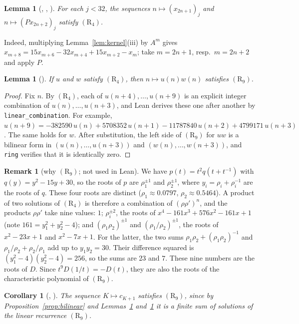 \documentclass[11pt]{amsart}
\theoremstyle{plain}
\newtheorem{lemma}[theorem]{Lemma}
\newtheorem{corollary}[theorem]{Corollary}
\theoremstyle{definition}
\newtheorem{remark}[theorem]{Remark}
\begin{document}
\begin{lemma}[, , ]\label{lem:rec4}
For each $j<32$, the sequences $n\mapsto(x_{2n+1})_j$ and $n\mapsto(Px_{2n+2})_j$ satisfy $(\mathrm{R}_4)$.
\end{lemma}

\noindent Indeed, multiplying Lemma~\ref{lem:kernel}(iii) by $A^m$ gives $x_{m+8}=15x_{m+6}-32x_{m+4}+15x_{m+2}-x_m$; take $m=2n+1$, resp.\ $m=2n+2$ and apply $P$.

\begin{lemma}[]\label{lem:prod}
If $u$ and $w$ satisfy $(\mathrm{R}_4)$, then $n\mapsto u(n)w(n)$ satisfies $(\mathrm{R}_9)$.
\end{lemma}

\begin{proof}
Fix $n$. By $(\mathrm{R}_4)$, each of $u(n+4),\dots,u(n+9)$ is an explicit integer combination of $u(n),\dots,u(n+3)$, and Lean derives these one after another by \texttt{linear\_combination}. For example,
$u(n+9)=-382590\,u(n)+5708352\,u(n+1)-11787840\,u(n+2)+4799171\,u(n+3)$.
The same holds for $w$. After substitution, the left side of $(\mathrm{R}_9)$ for $uw$ is a bilinear form in $(u(n),\dots,u(n+3))$ and $(w(n),\dots,w(n+3))$, and \texttt{ring} verifies that it is identically zero.
\end{proof}

\begin{remark}[why $(\mathrm{R}_9)$; not used in Lean]\label{rem:roots}
We have $p(t)=t^2q(t+t^{-1})$ with $q(y)=y^2-15y+30$, so the roots of $p$ are $\rho_1^{\pm1}$ and $\rho_2^{\pm1}$, where $y_i=\rho_i+\rho_i^{-1}$ are the roots of $q$. These four roots are distinct ($\rho_1\approx0.0797$, $\rho_2\approx0.5464$). A product of two solutions of $(\mathrm{R}_4)$ is therefore a combination of $(\rho\rho')^n$, and the products $\rho\rho'$ take nine values: $1$; $\rho_i^{\pm2}$, the roots of $x^4-161x^3+576x^2-161x+1$ (note $161=y_1^2+y_2^2-4$); and $(\rho_1\rho_2)^{\pm1}$ and $(\rho_1/\rho_2)^{\pm1}$, the roots of $x^2-23x+1$ and $x^2-7x+1$. For the latter, the two sums $\rho_1\rho_2+(\rho_1\rho_2)^{-1}$ and $\rho_1/\rho_2+\rho_2/\rho_1$ add up to $y_1y_2=30$. Their difference squared is $(y_1^2-4)(y_2^2-4)=256$, so the sums are $23$ and $7$. These nine numbers are the roots of $D$. Since $t^9D(1/t)=-D(t)$, they are also the roots of the characteristic polynomial of $(\mathrm{R}_9)$.
\end{remark}

\begin{corollary}[, ]\label{cor:rec9}
The sequence $K\mapsto c_{K+1}$ satisfies $(\mathrm{R}_9)$, since by Proposition~\ref{prop:bilinear} and Lemmas~\ref{lem:rec4} and~\ref{lem:prod} it is a finite sum of solutions of the linear recurrence $(\mathrm{R}_9)$.
\end{corollary}
\end{document}
